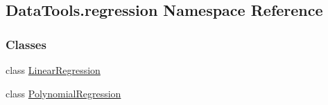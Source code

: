 \hypertarget{namespaceDataTools_1_1regression}{}\subsection{Data\+Tools.\+regression Namespace Reference}
\label{namespaceDataTools_1_1regression}
\subsubsection*{Classes}
\begin{DoxyCompactItemize}
\item 
class \hyperlink{classDataTools_1_1regression_1_1LinearRegression}{Linear\+Regression}
\item 
class \hyperlink{classDataTools_1_1regression_1_1PolynomialRegression}{Polynomial\+Regression}
\end{DoxyCompactItemize}
